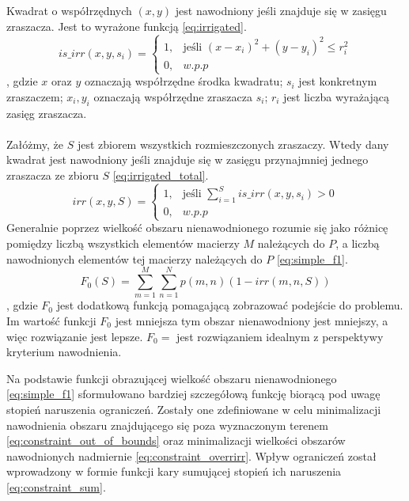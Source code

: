 \documentclass[twoside]{iisthesis}
\begin{document}
Kwadrat o współrzędnych $(x,y)$ jest nawodniony jeśli znajduje się w zasięgu zraszacza. Jest to wyrażone funkcją \eqref{eq:irrigated}.
\begin{equation}\label{eq:irrigated}
	is\_irr(x, y, s_{i}) = \begin{cases}
							1,& \text{jeśli } (x - x_{i})^{2} + (y - y_{i})^2 \leq r_{i}^{2}\\
							0,& w.p.p
						  \end{cases}
\end{equation}
, gdzie $x$ oraz $y$ oznaczają współrzędne środka kwadratu; $s_{i}$ jest konkretnym zraszaczem; $x_{i}, y_{i}$ oznaczają współrzędne zraszacza $s_{i}$; $r_{i}$ jest liczba wyrażającą zasięg zraszacza.\\\\
Załóżmy, że $S$ jest zbiorem wszystkich rozmieszczonych zraszaczy. Wtedy dany kwadrat jest nawodniony jeśli znajduje się w zasięgu przynajmniej jednego zraszacza ze zbioru $S$ \eqref{eq:irrigated_total}.
\begin{equation}\label{eq:irrigated_total}
	irr(x, y, S) = \begin{cases}
				   	1,& \text{jeśli } \sum_{i=1}^{S} is\_irr(x,y,s_{i}) > 0 \\
				   	0,& w.p.p			   	
				   \end{cases}
\end{equation}
Generalnie poprzez wielkość obszaru nienawodnionego rozumie się jako różnicę pomiędzy liczbą wszystkich elementów macierzy $M$ należących do $P$, a liczbą nawodnionych elementów tej macierzy należących do $P$ \eqref{eq:simple_f1}.
\begin{equation}\label{eq:simple_f1}
	F_{0}(S) = \sum_{m=1}^{M}\sum_{n=1}^{N} p(m,n)(1 - irr(m,n,S))
\end{equation}
, gdzie $F_{0}$ jest dodatkową funkcją pomagającą zobrazować podejście do problemu. Im wartość funkcji $F_{0}$ jest mniejsza tym obszar nienawodniony jest mniejszy, a więc rozwiązanie jest lepsze. $F_{0} = $ jest rozwiązaniem idealnym z perspektywy kryterium nawodnienia.


Na podstawie funkcji obrazującej wielkość obszaru nienawodnionego \eqref{eq:simple_f1} sformułowano bardziej szczegółową funkcję biorącą pod uwagę stopień naruszenia ograniczeń. Zostały one zdefiniowane w celu minimalizacji nawodnienia obszaru znajdującego się poza wyznaczonym terenem \eqref{eq:constraint_out_of_bounds} oraz minimalizacji wielkości obszarów nawodnionych nadmiernie \eqref{eq:constraint_overrirr}. Wpływ ograniczeń został wprowadzony w formie funkcji kary sumującej stopień ich naruszenia \eqref{eq:constraint_sum}.
\end{document}
